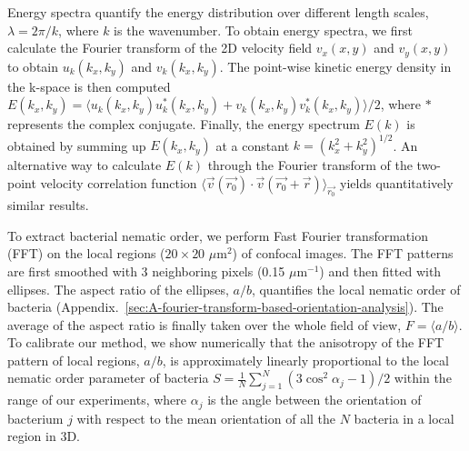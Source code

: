 Energy spectra quantify the energy distribution over different length scales, $\lambda = 2\pi/k$, where $k$ is the wavenumber. To obtain energy spectra, we first calculate the Fourier transform of the 2D velocity field $v_x(x,y)$ and $v_y(x,y)$ to obtain $u_k(k_x,k_y)$ and $v_k(k_x,k_y)$. The point-wise kinetic energy density in the k-space is then computed $E(k_x, k_y) = \langle u_k(k_x, k_y)u^*_k(k_x, k_y)+v_k(k_x, k_y)v_k^*(k_x, k_y)\rangle/2$, where $*$ represents the complex conjugate. Finally, the energy
spectrum $E(k)$ is obtained by summing up $E(k_x,k_y)$ at a constant $k=(k_x^2+k_y^2)^{1/2}$. An alternative way to calculate $E(k)$ through the Fourier transform of the two-point velocity correlation function $\langle \vec{v}(\vec{r_0})\cdot\vec{v}(\vec{r_0}+\vec{r})  \rangle_{\vec{r_0}}$ yields quantitatively similar results.

To extract bacterial nematic order, we perform Fast Fourier transformation (FFT) on the local regions ($20 \times 20$ $\mu$m$^2$) of confocal images. The FFT patterns are first smoothed with 3 neighboring pixels (0.15 $\mu$m$^{-1}$) and then fitted with ellipses. The aspect ratio of the ellipses, $a/b$, quantifies the local nematic order of bacteria (Appendix.~\ref{sec:A-fourier-transform-based-orientation-analysis}). The average of the aspect ratio is finally taken over the whole field of view, $F = \langle a/b \rangle$. To calibrate our method, we show numerically that the anisotropy of the FFT pattern of local regions, $a/b$, is approximately linearly proportional to the local nematic order parameter of bacteria $S=\frac{1}{N}\sum_{j=1}^N(3\cos^2\alpha_j - 1)/2$ within the range of our experiments, where $\alpha_j$ is the angle between the orientation of bacterium $j$ with respect to the mean orientation of all the $N$ bacteria in a local region in 3D.


